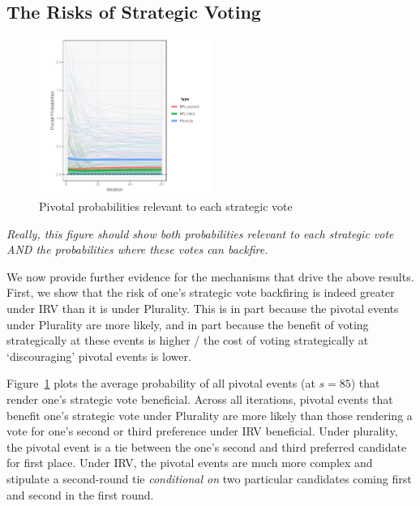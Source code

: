 \documentclass[12pt, letter]{article}
\begin{document}
\subsection{The Risks of Strategic Voting}

\begin{figure}[!htb]
	\centering
	\includegraphics[width = 0.5\textwidth]{../output/figures/conj1}
	\caption{Pivotal probabilities relevant to each strategic vote}
	\label{fig:pivot}
\end{figure}

\emph{Really, this figure should show both probabilities relevant to each strategic vote AND the probabilities where these votes can backfire.}

We now provide further evidence for the mechanisms that drive the above results. First, we show that the risk of one's strategic vote backfiring is indeed greater under IRV than it is under Plurality. This is in part because the pivotal events under Plurality are more likely, and in part because the benefit of voting strategically at these events is higher / the cost of voting strategically at `discouraging' pivotal events is lower.

Figure~\ref{fig:pivot} plots the average probability of all pivotal events (at $s = 85$) that render one's strategic vote beneficial. Across all iterations, pivotal events that benefit one's strategic vote under Plurality are more likely than those rendering a vote for one's second or third preference under IRV beneficial. Under plurality, the pivotal event is a tie between the one's second and third preferred candidate for first place. Under IRV, the pivotal events are much more complex and stipulate a second-round tie \emph{conditional on} two particular candidates coming first and second in the first round.
\end{document}
